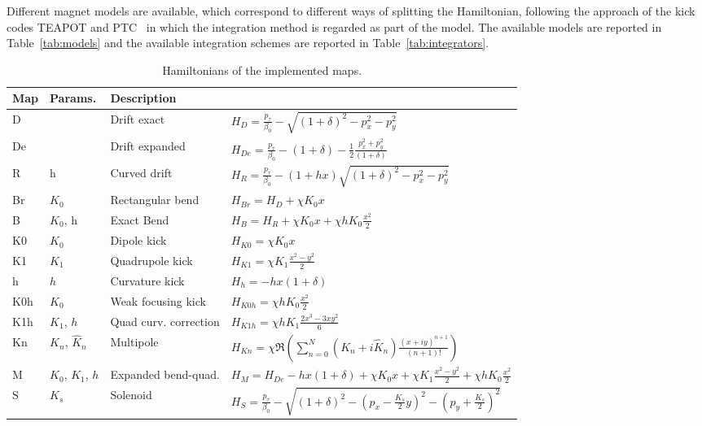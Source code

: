 Different magnet models are available, which correspond to different ways of splitting
the Hamiltonian, following the approach of the kick codes TEAPOT and PTC~\cite{ptc_report}
in which the integration method is regarded as part of the model. The available models are reported in Table~\ref{tab:models} and
the available integration schemes are reported in Table~\ref{tab:integrators}.

\begin{table}[htb]
\centering
{\small
\begin{tabular}{llll}
\toprule
\textbf{Map} & \textbf{Params.} & \textbf{Description} \\
\midrule
D   &            & Drift exact   &
$H_D = \frac{p_\tau}{\beta_0} - \sqrt{(1 + \delta)^2 - p_x^2 - p_y^2}$ \\
De  &            & Drift expanded &
$H_{De} = \frac{p_\tau}{\beta_0} - (1 + \delta) - \frac{1}{2}\frac{p_x^2 + p_y^2}{(1 + \delta)}$\\
R   & h         & Curved drift&
$H_R = \frac{p_\tau}{\beta_0} - (1+h x) \sqrt{(1 + \delta)^2 - p_x^2 - p_y^2}$\\
Br  & $K_0$        & Rectangular bend &
$H_{Br} = H_D + \chi K_0 x$
\\
B   & $K_0$, h     & Exact Bend &
$H_{B} = H_R + \chi K_0 x + \chi h K_0 \frac{x^2}{2}$\\
K0  & $K_0$           & Dipole kick &
$H_{K0} = \chi K_0 x$\\
K1  & $K_1$       & Quadrupole kick &
$H_{K1} = \chi K_1\frac{x^2 - y^2}{2}$\\
h  & $h$         & Curvature kick &
$H_{h} = -h x (1 + \delta)$\\
K0h & $K_0$          & Weak focusing kick &
$H_{K0h} = \chi h K_0  \frac{x^2}{2}$\\
K1h & $K_1$, $h$      & Quad curv. correction &
$H_{K1h} = \chi h K_1 \frac{2 x^3 - 3 xy^2}{6}$\\
Kn  & $K_n$, $\hat{K}_n$     & Multipole &
$H_{Kn} = \chi \Re\left( \sum_{n=0}^N (K_n+i{\hat K}_n)\frac{(x+iy)^{n+1}}{(n+1)!}\right)$
\\
M   & $K_0$, $K_1$, $h$ & Expanded bend-quad. &
$H_{M} =  H_{De} - h x (1 + \delta) + \chi K_0 x + \chi K_1\frac{x^2 - y^2}{2} + \chi h K_0 \frac{x^2}{2}$\\
S   & $K_s$          & Solenoid &
$H_{S} = \frac{p_\tau}{\beta_0} - \sqrt{(1 + \delta)^2 - \left(p_x-\frac{K_s}{2} y\right)^2 - \left(p_y+\frac{K_s}{2}\right)^2}$
\\
\bottomrule
\end{tabular}
}
\caption{Hamiltonians of the implemented maps.
        \label{tab:maps}}
\end{table}


